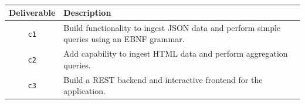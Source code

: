 \begin{table}[h]
\centering
\begin{tabular}{c|l}
\toprule
\textbf{Deliverable} & \textbf{Description} \\
\midrule
\texttt{c1} & Build functionality to ingest JSON data and perform simple queries using an EBNF grammar. \\
\texttt{c2} & Add capability to ingest HTML data and perform aggregation queries. \\
\texttt{c3} & Build a REST backend and interactive frontend for the application. \\
\bottomrule
\end{tabular}
\caption{}
\label{tab:project-deliverables}
\end{table}
